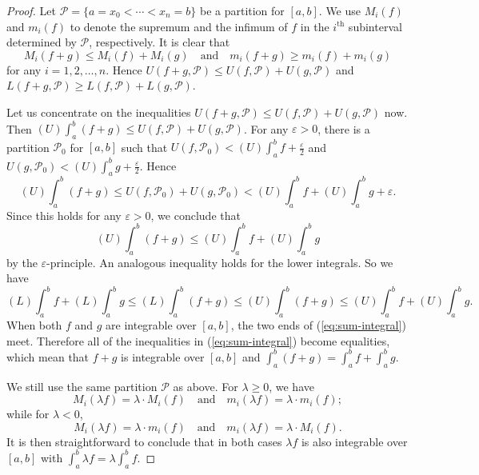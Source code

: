 \begin{proof}
  Let $\mathcal{P} = \{ a = x_0 < \cdots < x_n = b \}$ be a partition for $[a,b]$.  We use $M_i(f)$ and $m_i(f)$ to denote the supremum and the infimum of $f$ in the $i^{\text{th}}$ subinterval determined by $\mathcal{P}$, respectively.
  It is clear that
  \[
    M_i(f+g) \leqslant M_i(f) + M_i(g) \quad
    \text{and} \quad
    m_i(f+g) \geqslant m_i(f) + m_i(g)
  \]
  for any $i = 1, 2, \dots, n$.  Hence $U(f+g, \mathcal{P}) \leqslant U(f,\mathcal{P}) + U(g,\mathcal{P})$ and $L(f+g,\mathcal{P}) \geqslant L(f,\mathcal{P}) + L(g,\mathcal{P})$.
  
  Let us concentrate on the inequalities $U(f+g, \mathcal{P}) \leqslant U(f,\mathcal{P}) + U(g,\mathcal{P})$ now.
  Then $(U)\int_a^b (f+g) \leqslant U(f,\mathcal{P}) + U(g,\mathcal{P})$.
  For any $\varepsilon > 0$, there is a partition $\mathcal{P}_0$ for $[a,b]$ such that $U(f,\mathcal{P}_0) < (U)\int_a^b f + \frac{\varepsilon}{2}$ and $U(g,\mathcal{P}_0) < (U)\int_a^b g + \frac{\varepsilon}{2}$. Hence
  \[
    (U) \int_a^b (f + g) \leqslant U(f, \mathcal{P}_0) + U(g, \mathcal{P}_0) < (U) \int_a^b f + (U) \int_a^b g + \varepsilon.
  \]
  Since this holds for any $\varepsilon > 0$, we conclude that 
  \[
    (U) \int_a^b (f+g) \leqslant (U)\int_a^b f + (U)\int_a^b g
  \]
  by the $\varepsilon$-principle.
  An analogous inequality holds for the lower integrals.
  So we have
  \begin{equation}
    \label{eq:sum-integral}
  (L) \int_a^b f + (L) \int_a^b g \leqslant (L) \int_a^b (f+g) \leqslant 
(U) \int_a^b (f+g) \leqslant (U) \int_a^b f + (U) \int_a^b g.
  \end{equation}
  When both $f$ and $g$ are integrable over $[a,b]$, 
  the two ends of (\ref{eq:sum-integral}) meet.  
  Therefore all of the inequalities in (\ref{eq:sum-integral}) become equalities, which mean that $f+g$ is integrable over $[a,b]$ and $\int_a^b (f+g) = \int_a^b f + \int_a^b g$.

  We still use the same partition $\mathcal{P}$ as above.
  For $\lambda \geqslant 0$, we have
  \[
    M_i(\lambda f) = \lambda \cdot M_i(f) \quad
    \text{and} \quad
    m_i(\lambda f) = \lambda \cdot m_i(f);
  \]
  while for $\lambda < 0$,
  \[
    M_i(\lambda f) = \lambda \cdot m_i(f) \quad
    \text{and} \quad
    m_i(\lambda f) = \lambda \cdot M_i(f).
  \]
  It is then straightforward to conclude that in both cases $\lambda f$ is also integrable over $[a,b]$ with $\int_a^b \lambda f = \lambda \int_a^b f$.
\end{proof}

